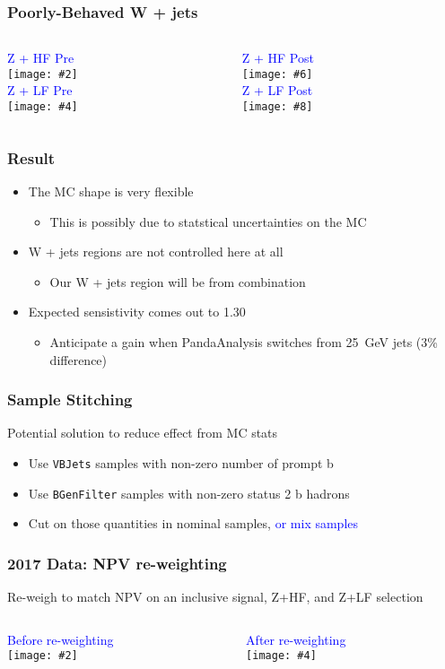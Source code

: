 \documentclass{beamer}
\newcommand{\twofigs}[4]{
  \begin{columns}
    \begin{column}{0.5\linewidth}
      \centering
      \textcolor{blue}{#1} \\
      \texttt{[image: \#2]}
    \end{column}
    \begin{column}{0.5\linewidth}
      \centering
      \textcolor{blue}{#3} \\
      \texttt{[image: \#4]}
    \end{column}
  \end{columns}
}
\newcommand{\fourfigs}[8]{
  \begin{columns}
    \begin{column}{0.3\linewidth}
      \centering
      \textcolor{blue}{#1} \\
      \texttt{[image: \#2]} \\
      \textcolor{blue}{#3} \\
      \texttt{[image: \#4]}
    \end{column}
    \begin{column}{0.3\linewidth}
      \centering
      \textcolor{blue}{#5} \\
      \texttt{[image: \#6]} \\
      \textcolor{blue}{#7} \\
      \texttt{[image: \#8]}
    \end{column}
  \end{columns}
}
\begin{document}
\begin{frame}
  \frametitle{Poorly-Behaved W + jets}
  \fourfigs{Z + HF Pre}
           {180514__pre/inclusive_heavyz_cmva_jet2_cmva.pdf}
           {Z + LF Pre}
           {180514__pre/inclusive_lightz_cmva_jet2_cmva.pdf}
           {Z + HF Post}
           {180514_v1/inclusive_heavyz_cmva_jet2_cmva.pdf}
           {Z + LF Post}
           {180514_v1/inclusive_lightz_cmva_jet2_cmva.pdf}
\end{frame}

\begin{frame}
  \frametitle{Result}
  \begin{itemize}
  \item The MC shape is very flexible
    \begin{itemize}
    \item This is possibly due to statstical uncertainties on the MC
    \end{itemize}
  \item W + jets regions are not controlled here at all
    \begin{itemize}
    \item Our W + jets region will be from combination
    \end{itemize}
  \item Expected sensistivity comes out to 1.30
    \begin{itemize}
    \item Anticipate a gain when PandaAnalysis switches from \SI{25}{GeV} jets
      (3\% difference)
    \end{itemize}
  \end{itemize}
\end{frame}

\begin{frame}
  \frametitle{Sample Stitching}
  Potential solution to reduce effect from MC stats
  \begin{itemize}
  \item Use \texttt{VBJets} samples with non-zero number of prompt b 
  \item Use \texttt{BGenFilter} samples with non-zero status 2 b hadrons
  \item Cut on those quantities in nominal samples, \textcolor{blue}{or mix samples}
  \end{itemize}
\end{frame}

\begin{frame}
  \frametitle{2017 Data: NPV re-weighting}

  Re-weigh to match NPV on an inclusive signal, Z+HF, and Z+LF selection

  \vspace{6pt}

  \twofigs{Before re-weighting}
          {180515_npv/npv.pdf}
          {After re-weighting}
          {180515_lumi/npv.pdf}

\end{frame}
\end{document}
